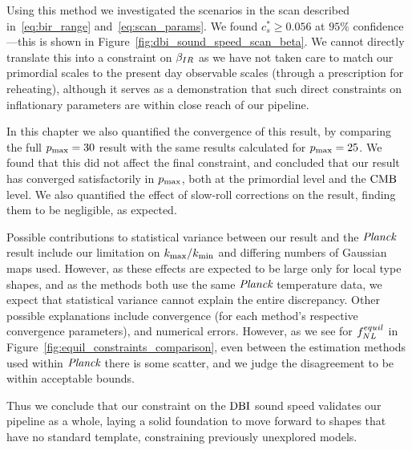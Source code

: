     Using this method we investigated the scenarios in the scan described in~\eqref{eq:bir_range}
    and~\eqref{eq:scan_params}. We found $c_s^*\ge0.056$ at $95\%$ confidence---this
    is shown in Figure~\ref{fig:dbi_sound_speed_scan_beta}.
    We cannot directly translate this into a constraint on $\beta_{IR}$ as we have not
    taken care to match our primordial scales to the present day observable scales
    (through a prescription for reheating), although it serves as a demonstration
    that such direct constraints on inflationary parameters are within close reach
    of our pipeline.


    In this chapter we also quantified the convergence of this result, by comparing the full $p_\text{max}=30$
    result with the same results calculated for $p_\text{max}=25$. We found that this did not affect the
    final constraint, and concluded that our result has converged satisfactorily in $p_\text{max}$,
    both at the primordial level and the $\text{CMB}$ level.
    We also quantified the effect of slow-roll corrections on the result,
    finding them to be negligible, as expected.


    Possible contributions to statistical variance between our result and the $\textit{Planck}$ result
    include our limitation on ${k_\text{max}}/{k_\text{min}}$ and differing numbers of Gaussian maps used.
    However, as these effects are expected to be large only for local
    type shapes, and as the methods both use the same $\textit{Planck}$ temperature data,
    we expect that statistical variance cannot explain the entire discrepancy.
    Other possible explanations include
    convergence (for each method's respective convergence parameters),
    and numerical errors.
    However, as we see for $f^{equil}_{NL}$ in Figure~\ref{fig:equil_constraints_comparison},
    even between the estimation methods used within $\textit{Planck}$ there is some scatter,
    and we judge the disagreement to be within acceptable bounds.


    Thus we conclude that our constraint on the $\text{DBI}$ sound speed validates our pipeline as a whole,
    laying a solid foundation to move forward to shapes that have no standard template,
    constraining previously unexplored models.


